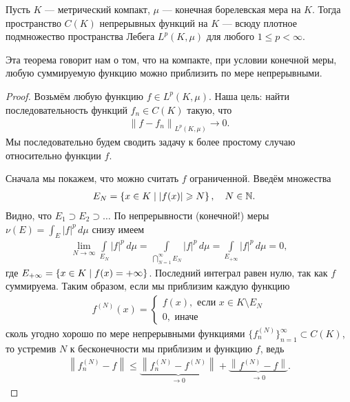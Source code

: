 \begin{thm}[%
]
  Пусть $K$ --- метрический компакт, $\mu$ --- конечная борелевская мера на $K$. Тогда пространство $C(K)$ непрерывных функций на $K$ --- всюду плотное подмножество пространства Лебега $L^{p}(K, \mu)$ для любого $1 \leqslant p < \infty$.
\end{thm}
Эта теорема говорит нам о том, что на компакте, при условии конечной меры, любую суммируемую функцию можно приблизить по мере непрерывными.
\begin{proof}
 Возьмём любую функцию $f \in L^{p}(K,\mu)$. Наша цель: найти последовательность функций $f_n \in C(K)$ такую, что \begin{align*}
  \left\| f - f_n \right\|_{L^{p}(K,\mu)} \to 0
 .\end{align*} Мы последовательно будем сводить задачу к более простому случаю относительно функции $f$.

 Сначала мы покажем, что можно считать $f$ ограниченной. Введём множества  \begin{align*}
 E_N &= \left\{ x \in K \mid \left| f(x) \right| \geqslant N \right\}, \quad N \in \mathbb{N}
.\end{align*} Видно, что $E_1 \supset E_2 \supset \ldots $ По непрерывности (конечной!) меры $\nu(E) = \int_{E} \left| f \right|^{p} \, d\mu  $  снизу имеем \begin{align*}
 \lim_{N \to \infty} \int\limits_{E_N} \left| f \right|^{p} \, d\mu = \int\limits_{\bigcap_{N=1}^{\infty} E_N} \left| f \right|^{p} \, d\mu = \int\limits_{E_{+\infty}} \left| f \right|^{p} \, d\mu   = 0
,\end{align*}  где $E_{+\infty} = \left\{ x \in K \;\middle|\; f(x) = +\infty \right\}$. Последний интеграл равен нулю, так как $f$ суммируема. Таким образом, если мы приблизим каждую функцию 
\begin{align*}
f^{(N)}(x) = \begin{cases}
 f(x), \text{ если } x \in K \setminus E_N \\
 0, \text{ иначе }
\end{cases} 
\end{align*}
 сколь угодно хорошо по мере непрерывными функциями $\{f_{n}^{(N)}\}_{n=1}^{\infty} \subset C(K)$, то устремив $N$ к бесконечности мы приблизим и функцию $f$, ведь \begin{align*}
  \left\| f_n^{(N)} - f \right\| \leqslant \underbrace{\left\| f_n^{(N)} - f^{(N)} \right\|}_{\to 0} + \underbrace{\left\| f^{(N)} - f \right\|}_{\to 0}
 .\end{align*} 


\end{proof}
